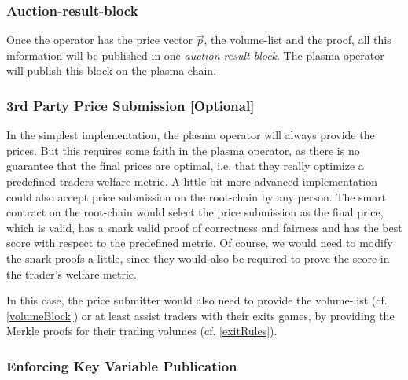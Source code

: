 \documentclass[11pt,parskip=full]{scrartcl}%
\begin{document}
\subsubsection*{Auction-result-block}

Once the operator has the price vector $\vec{p}$, the volume-list and the proof, all this information will be published in one \emph{auction-result-block}. The plasma operator will publish this block on the plasma chain. 


\subsubsection*{3rd Party Price Submission [Optional]}
\label{publicPrices}
In the simplest implementation, the plasma operator will always provide the prices. But this requires some faith in the plasma operator, as there is no guarantee that the final prices are optimal, i.e. that they really optimize a predefined traders welfare metric.
A little bit more advanced implementation could also accept price submission on the root-chain by any person. 
The smart contract on the root-chain would select the price submission as the final price, which is valid, has a snark valid proof of correctness and fairness and has the best score with respect to the predefined metric. Of course, we would need to modify the snark proofs a little, since they would also be required to prove the score in the trader's welfare metric. 

In this case, the price submitter would also need to provide the volume-list (cf. \ref{volumeBlock}) or at least assist traders with their exits games, by providing the Merkle proofs for their trading volumes (cf. \ref{exitRules}). 


\subsubsection{Enforcing Key Variable Publication}
\end{document}
